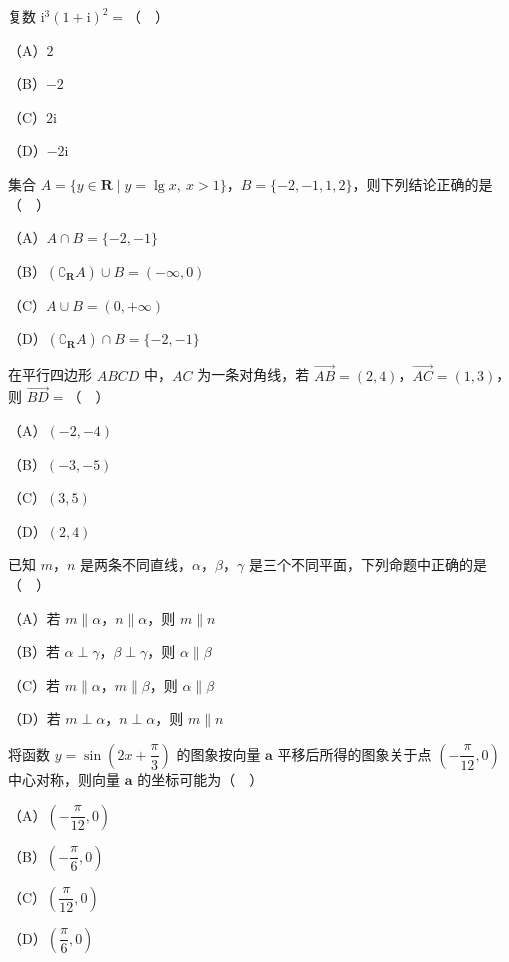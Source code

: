 


\begin{question}
复数 $\mathrm i^3(1+\mathrm i)^2=$（　）

（A）$2$

（B）$-2$

（C）$2\mathrm i$

（D）$-2\mathrm i$

\end{question}
\begin{question}
集合 $A=\{y\in\mathbf R\mid y=\lg x,\ x>1\}$，$B=\{-2,-1,1,2\}$，则下列结论正确的是（　）

（A）$A\cap B=\{-2,-1\}$

（B）$(\complement_{\mathbf R}A)\cup B=(-\infty,0)$

（C）$A\cup B=(0,+\infty)$

（D）$(\complement_{\mathbf R}A)\cap B=\{-2,-1\}$

\end{question}
\begin{question}
在平行四边形 $ABCD$ 中，$AC$ 为一条对角线，若 $\overrightarrow{AB}=(2,4)$，$\overrightarrow{AC}=(1,3)$，则 $\overrightarrow{BD}=$（　）

（A）$(-2,-4)$

（B）$(-3,-5)$

（C）$(3,5)$

（D）$(2,4)$

\end{question}
\begin{question}
已知 $m$，$n$ 是两条不同直线，$\alpha$，$\beta$，$\gamma$ 是三个不同平面，下列命题中正确的是（　）

（A）若 $m\parallel\alpha$，$n\parallel\alpha$，则 $m\parallel n$

（B）若 $\alpha\perp\gamma$，$\beta\perp\gamma$，则 $\alpha\parallel\beta$

（C）若 $m\parallel\alpha$，$m\parallel\beta$，则 $\alpha\parallel\beta$

（D）若 $m\perp\alpha$，$n\perp\alpha$，则 $m\parallel n$

\end{question}
\begin{question}
将函数 $y=\sin\left(2x+\dfrac{\pi}{3}\right)$ 的图象按向量 $\boldsymbol a$ 平移后所得的图象关于点 $\left(-\dfrac{\pi}{12},0\right)$ 中心对称，则向量 $\boldsymbol a$ 的坐标可能为（　）

（A）$\left(-\dfrac{\pi}{12},0\right)$

（B）$\left(-\dfrac{\pi}{6},0\right)$

（C）$\left(\dfrac{\pi}{12},0\right)$

（D）$\left(\dfrac{\pi}{6},0\right)$

\end{question}
